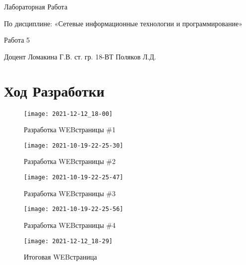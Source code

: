 \documentclass[14pt]{extarticle}
\let\oldsection\section
\renewcommand\section{\clearpage\oldsection}
\begin{document}
\unititle
{\klgtu}
{\fapu}
{\suvt}
{Лабораторная Работа}
{По дисциплине: «Сетевые информационные технологии и программирование» \par Работа 5}
{Доцент}
{Ломакина Г.В.}
{ст. гр. 18-ВТ}
{Поляков Л.Д.}

\tableofcontents


\section{Ход Разработки}

\begin{figure}[h]
    \centering
	\texttt{[image: 2021-12-12\_18-00]}
    \caption{Разработка WEB\-страницы \#1}
    \label{fig:html1}
\end{figure}

\begin{figure}[h]
    \centering
	\texttt{[image: 2021-10-19-22-25-30]}
    \caption{Разработка WEB\-страницы \#2}
    \label{fig:html2}
\end{figure}

\begin{figure}[h]
    \centering
	\texttt{[image: 2021-10-19-22-25-47]}
    \caption{Разработка WEB\-страницы \#3}
    \label{fig:html3}
\end{figure}

\begin{figure}[h]
    \centering
	\texttt{[image: 2021-10-19-22-25-56]}
    \caption{Разработка WEB\-страницы \#4}
    \label{fig:html4}
\end{figure}

\begin{figure}[h]
    \centering
	\texttt{[image: 2021-12-12\_18-29]}
    \caption{Итоговая WEB\-страница}
    \label{fig:html4}
\end{figure}
\end{document}
